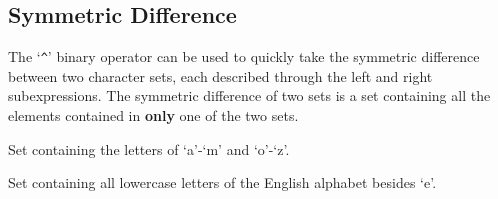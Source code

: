 
\subsection{Symmetric Difference}
{
	The `\texttt{\^}' binary operator can be used to quickly take the
	symmetric difference between two character sets, each described through
	the left and right subexpressions. The symmetric difference of two sets is
	a set containing all the elements contained in \textbf{only} one of the
	two sets.
	
	\begin{itemize}
	{
		\item[\texttt{`a'-`o' \^{}`m'-`z'}] Set containing the letters of `a'-`m'
			and `o'-`z'.
		
		\item[\texttt{`a'-`z' \^{}`e'}] Set containing all lowercase letters
			of the English alphabet besides `e'.
	}
	\end{itemize}
}
